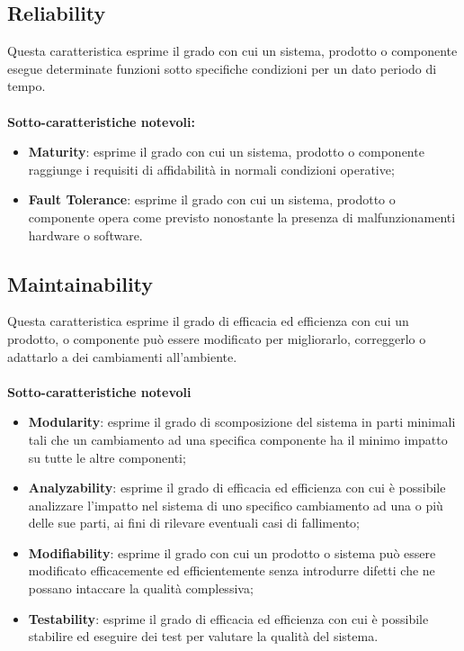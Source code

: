 \subsection{Reliability}
Questa caratteristica esprime il grado con cui un sistema, prodotto o componente esegue determinate funzioni sotto specifiche condizioni per un dato periodo di tempo. \\ \\
\textbf{Sotto-caratteristiche notevoli:}
\begin{itemize}
	\item{\textbf{Maturity}}: esprime il grado con cui un sistema, prodotto o componente raggiunge i requisiti di affidabilità in normali condizioni operative;
	\item{\textbf{Fault Tolerance}}: esprime il grado con cui un sistema, prodotto o componente opera come previsto nonostante la presenza di malfunzionamenti hardware o software.
\end{itemize}

\subsection{Maintainability}
Questa caratteristica esprime il grado di efficacia ed efficienza con cui un prodotto, o componente può essere modificato per migliorarlo, correggerlo o adattarlo a dei cambiamenti all'ambiente. \\ \\
\textbf{Sotto-caratteristiche notevoli}
\begin{itemize}
	\item{\textbf{Modularity}}: esprime il grado di scomposizione del sistema in parti minimali tali che un cambiamento ad una specifica componente ha il minimo impatto su tutte le altre componenti;
	\item{\textbf{Analyzability}}: esprime il grado di efficacia ed efficienza con cui è possibile analizzare l'impatto nel sistema di uno specifico cambiamento ad una o più delle sue parti, ai fini di rilevare eventuali casi di fallimento;
	\item{\textbf{Modifiability}}: esprime il grado con cui un prodotto o sistema può essere modificato efficacemente ed efficientemente senza introdurre difetti che ne possano intaccare la qualità complessiva;
	\item{\textbf{Testability}}: esprime il grado di efficacia ed efficienza con cui è possibile stabilire ed eseguire dei test per valutare la qualità del sistema.
\end{itemize}

